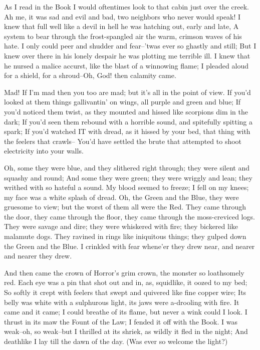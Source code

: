 \begin{poemblock}
 As I read in the Book I would oftentimes look
   to that cabin just over the creek.
 Ah me, it was sad and evil and bad, two neighbors who never would speak!
 I knew that full well like a devil in hell
   he was hatching out, early and late,
 A system to bear through the frost-spangled air
   the warm, crimson waves of his hate.
 I only could peer and shudder and fear--'twas ever so ghastly and still;
 But I knew over there in his lonely despair
   he was plotting me terrible ill.
 I knew that he nursed a malice accurst,
   like the blast of a winnowing flame;
 I pleaded aloud for a shield, for a shroud--Oh, God! then calamity came.

 Mad!  If I'm mad then you too are mad; but it's all in the point of view.
 If you'd looked at them things gallivantin' on wings,
   all purple and green and blue;
 If you'd noticed them twist, as they mounted and hissed
   like scorpions dim in the dark;
 If you'd seen them rebound with a horrible sound,
   and spitefully spitting a spark;
 If you'd watched IT with dread, as it hissed by your bed,
   that thing with the feelers that crawls--
 You'd have settled the brute that attempted to shoot
   electricity into your walls.

 Oh, some they were blue, and they slithered right through;
   they were silent and squashy and round;
 And some they were green; they were wriggly and lean;
   they writhed with so hateful a sound.
 My blood seemed to freeze; I fell on my knees;
   my face was a white splash of dread.
 Oh, the Green and the Blue, they were gruesome to view;
   but the worst of them all were the Red.
 They came through the door, they came through the floor,
   they came through the moss-creviced logs.
 They were savage and dire; they were whiskered with fire;
   they bickered like malamute dogs.
 They ravined in rings like iniquitous things;
   they gulped down the Green and the Blue.
 I crinkled with fear whene'er they drew near,
   and nearer and nearer they drew.

 And then came the crown of Horror's grim crown,
   the monster so loathsomely red.
 Each eye was a pin that shot out and in, as, squidlike, it oozed to my bed;
 So softly it crept with feelers that swept
   and quivered like fine copper wire;
 Its belly was white with a sulphurous light,
   its jaws were a-drooling with fire.
 It came and it came; I could breathe of its flame,
   but never a wink could I look.
 I thrust in its maw the Fount of the Law; I fended it off with the Book.
 I was weak--oh, so weak--but I thrilled at its shriek,
   as wildly it fled in the night;
 And deathlike I lay till the dawn of the day.
   (Was ever so welcome the light?)


\end{poemblock}
